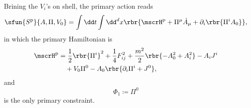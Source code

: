 \documentclass[a4paper,11pt]{article}
\begin{document}
Brining the $V_i$'s on shell, the primary action reads
\begin{align}
\sfun{S^\text{p}}{A, \Pi, V_0} = \int \dd t\int\dd^d x
\rbr{\mscrH^\text{p}+\Pi^\mu \dot A_\mu + \partial_i\rbr{\Pi^i A_0}},
\end{align}
in which the primary Hamiltonian is
\begin{align}
\mscrH^\text{p} &= \frac{1}{2} \rbr{\Pi^i}^2 + \frac{1}{4} F_{ij}^2 + 
\frac{m^2}{2} \rbr{-A_0^2 + A_i^2} - A_i J^i \nonumber \\
&\quad + V_0 \Pi^0 - A_0 \rbr{\partial_i \Pi^i + J^0},
\label{eq:primary-Hamil-general-MP}
\end{align}
and
\begin{equation}
\Phi_1 \coloneqq \Pi^0
\end{equation}
is the only primary constraint.
\end{document}
